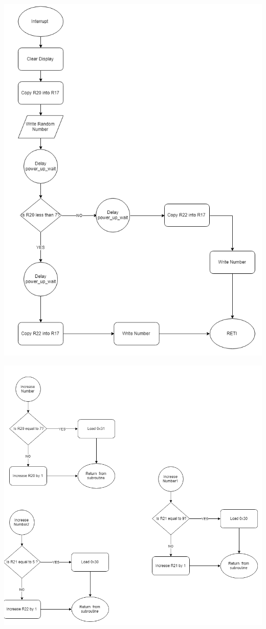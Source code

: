 \documentclass[a4paper,12pt]{article}
\begin{document}
\begin{center}
\includegraphics[scale=1.1]{img/Task2-2.png}
\end{center}
\begin{center}
\includegraphics[scale=0.9]{img/Task2-3.png}
\end{center}
\newpage
\end{document}
